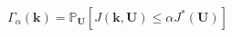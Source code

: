 \documentclass[11pt]{beamer}
\newcommand{\Prob}{\mathbb{P}}
\DeclareMathOperator*{\argmin}{arg\,min}
\begin{document}
{      \begin{equation*}
        \Gamma_{\alpha}(\bm{k}) = \Prob_{\bm{U}}\left[J(\bm{k},\bm{U}) \leq \alpha J^*(\bm{U}) \right]
      \end{equation*}
              }
\end{document}
